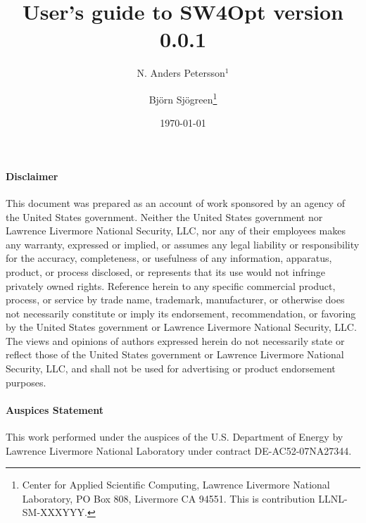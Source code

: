 \documentclass[11pt]{report}
\begin{document}
\title{\LARGE User's guide to SW4Opt version 0.0.1} 

\author{ N. Anders Petersson$^1$ \and Bj\"orn Sj\"ogreen\thanks{Center for Applied Scientific
     Computing, Lawrence Livermore National Laboratory, PO Box 808, Livermore CA 94551. This is
     contribution LLNL-SM-XXXYYY.}}
\date{\today} 
\maketitle
\pagestyle{myheadings}


\pagebreak
\paragraph {Disclaimer} 
This document was prepared as an account of work sponsored by an agency of the United States
government. Neither the United States government nor Lawrence Livermore National Security, LLC, nor
any of their employees makes any warranty, expressed or implied, or assumes any legal liability or
responsibility for the accuracy, completeness, or usefulness of any information, apparatus, product,
or process disclosed, or represents that its use would not infringe privately owned
rights. Reference herein to any specific commercial product, process, or service by trade name,
trademark, manufacturer, or otherwise does not necessarily constitute or imply its endorsement,
recommendation, or favoring by the United States government or Lawrence Livermore National Security,
LLC. The views and opinions of authors expressed herein do not necessarily state or reflect those of
the United States government or Lawrence Livermore National Security, LLC, and shall not be used for
advertising or product endorsement purposes. 

\paragraph{Auspices Statement}
This work performed under the auspices of the U.S. Department of Energy by Lawrence Livermore
National Laboratory under contract DE-AC52-07NA27344.
\tableofcontents

\end{document}
